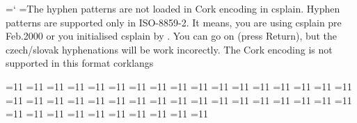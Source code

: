 %


\let\corkencoded\font %

\ifx\chyph\undefined\else \ifx\czCork\undefined 
  {\newlinechar=`^^J
   \errhelp={The hyphen patterns are not loaded in Cork encoding in csplain.^^J
            Hyphen patterns are supported only in ISO-8859-2.^^J
            It means, you are using csplain pre Feb.2000 or^^J
            you initialised csplain by \let\Cork=\relax.^^J
            You can go on (press Return), but the czech/slovak^^J
            hyphenations will be work incorectly.}
  \errmessage
  {The Cork encoding is not supported in this format} %
  } 
\fi\fi
\csname corklangs\endcsname

=11  %
=11  %
=11  %
=11  %
=11  %
=11  %
=11  %
=11  %
=11  %
=11  %
=11  %
=11  %
=11  %
=11  %
=11  %
=11  %
=11  %
=11  %
=11  %
=11  %
=11  %
=11  %
=11  %
=11  %
=11  %
=11  %
=11  %
=11  %
=11  %
=11  %
=11  %
=11  %
=11  %
=11  %
=11  %
=11  %
=11  %
=11  %
=11  %
=11  %
=11  %
=11  %
=11  %
=11  %
		

